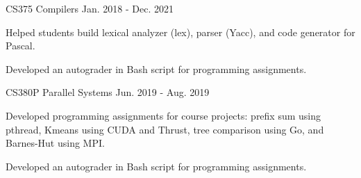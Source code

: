 
\begin{cventries}

  \cvresearchentry
    {CS375 Compilers} %
    {Jan. 2018 - Dec. 2021} %
    {
      \begin{cvitems} %
      \item Helped students build lexical analyzer (lex), parser (Yacc),
        and code generator for Pascal.
      \item Developed an autograder in Bash script for programming assignments.
      \end{cvitems}
    }

  \cvresearchentry
    {CS380P Parallel Systems} %
    {Jun. 2019 - Aug. 2019} %
    {
      \begin{cvitems} %
      \item Developed programming assignments for course projects: prefix sum
        using pthread, Kmeans using CUDA and Thrust, tree comparison using Go,
        and Barnes-Hut using MPI.
      \item Developed an autograder in Bash script for programming assignments.
      \end{cvitems}
    }
  
\end{cventries}